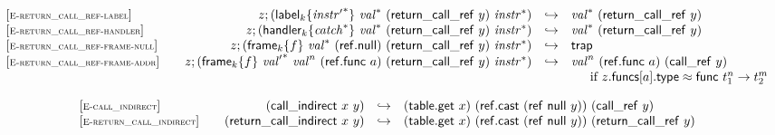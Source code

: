 $$
\begin{array}[t]{@{}lrcl@{}l@{}}
{[\textsc{\scriptsize E{-}return\_call\_ref{-}label}]} \quad & z ; ({{\mathsf{label}}_{k}}{\{ {{\mathit{instr}'}^\ast} \}}~{{\mathit{val}}^\ast}~(\mathsf{return\_call\_ref}~y)~{{\mathit{instr}}^\ast}) & \hookrightarrow & {{\mathit{val}}^\ast}~(\mathsf{return\_call\_ref}~y) \\
{[\textsc{\scriptsize E{-}return\_call\_ref{-}handler}]} \quad & z ; ({{\mathsf{handler}}_{k}}{\{ {{\mathit{catch}}^\ast} \}}~{{\mathit{val}}^\ast}~(\mathsf{return\_call\_ref}~y)~{{\mathit{instr}}^\ast}) & \hookrightarrow & {{\mathit{val}}^\ast}~(\mathsf{return\_call\_ref}~y) \\
{[\textsc{\scriptsize E{-}return\_call\_ref{-}frame{-}null}]} \quad & z ; ({{\mathsf{frame}}_{k}}{\{ f \}}~{{\mathit{val}}^\ast}~(\mathsf{ref{.}null})~(\mathsf{return\_call\_ref}~y)~{{\mathit{instr}}^\ast}) & \hookrightarrow & \mathsf{trap} \\
{[\textsc{\scriptsize E{-}return\_call\_ref{-}frame{-}addr}]} \quad & z ; ({{\mathsf{frame}}_{k}}{\{ f \}}~{{\mathit{val}'}^\ast}~{{\mathit{val}}^{n}}~(\mathsf{ref{.}func}~a)~(\mathsf{return\_call\_ref}~y)~{{\mathit{instr}}^\ast}) & \hookrightarrow & {{\mathit{val}}^{n}}~(\mathsf{ref{.}func}~a)~(\mathsf{call\_ref}~y) &  \\
&&& \multicolumn{2}{@{}l@{}}{\quad
\quad \mbox{if}~ z{.}\mathsf{funcs}{}[a]{.}\mathsf{type} \approx \mathsf{func}~{t_1^{n}} \rightarrow {t_2^{m}}
} \\
\end{array}
$$

\vspace{1ex}

$$
\begin{array}[t]{@{}lrcl@{}l@{}}
{[\textsc{\scriptsize E{-}call\_indirect}]} \quad & (\mathsf{call\_indirect}~x~y) & \hookrightarrow & (\mathsf{table{.}get}~x)~(\mathsf{ref{.}cast}~(\mathsf{ref}~\mathsf{null}~y))~(\mathsf{call\_ref}~y) \\
{[\textsc{\scriptsize E{-}return\_call\_indirect}]} \quad & (\mathsf{return\_call\_indirect}~x~y) & \hookrightarrow & (\mathsf{table{.}get}~x)~(\mathsf{ref{.}cast}~(\mathsf{ref}~\mathsf{null}~y))~(\mathsf{return\_call\_ref}~y) \\
\end{array}
$$

\vspace{1ex}

